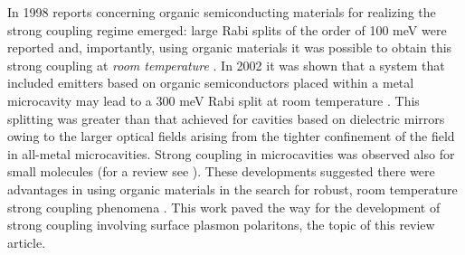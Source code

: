 \documentclass[12pt]{iopart}
\begin{document}
In 1998 reports concerning organic semiconducting materials for realizing the strong coupling regime emerged: large Rabi splits of the order of 100 meV were reported and, importantly, using organic materials it was possible to obtain this strong coupling at {\it room temperature} \cite{Lidzey1998,Lidzey2000}. In 2002 it was shown that a system that included emitters based on organic semiconductors placed within a metal microcavity may lead to a 300 meV Rabi split at room temperature \cite{Hobson2002}. This splitting was greater than that achieved for cavities based on dielectric mirrors owing to the larger optical fields arising from the tighter confinement of the field in all-metal microcavities. Strong coupling in microcavities was observed also for small molecules \cite{Holmes2004} (for a review see \cite{Holmes2007}). These developments suggested there were advantages in using organic materials in the search for robust, room temperature strong coupling phenomena \cite{Lidzey_Nature_1999_395_53,Lidzey_PRL_1999_82_3316,Lidzey_Science_2000_288_1620}. This work paved the way for the development of strong coupling involving surface plasmon polaritons, the topic of this review article.
\end{document}
